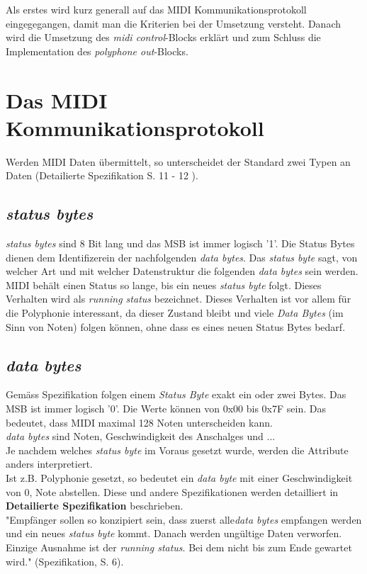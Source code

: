 Als erstes wird kurz generall auf das MIDI Kommunikationsprotokoll eingegegangen, damit man die Kriterien bei der Umsetzung versteht. Danach wird die Umsetzung des \textit{midi control}-Blocks erklärt und zum Schluss die Implementation des \textit{polyphone out}-Blocks.\\


\newpage
\section{Das MIDI Kommunikationsprotokoll}\label{sect.midi_spezification}
Werden MIDI Daten übermittelt, so unterscheidet der Standard zwei Typen an Daten (Detailierte Spezifikation S. 11 - 12 ).
\subsection{\textit{status bytes}}
\textit{status bytes} sind 8 Bit lang und das MSB ist immer logisch '1'. Die Status Bytes dienen dem Identifizerein der nachfolgenden \textit{data bytes}. Das \textit{status byte} sagt, von welcher Art und mit welcher Datenstruktur die folgenden \textit{data bytes} sein werden.\\
MIDI behält einen Status so lange, bis ein neues \textit{status byte} folgt. Dieses Verhalten wird als \textit{running status} bezeichnet. Dieses Verhalten ist vor allem für die Polyphonie interessant, da dieser Zustand bleibt und viele \textit{Data Bytes} (im Sinn von Noten) folgen können, ohne dass es eines neuen Status Bytes bedarf.\\

\subsection{\textit{data bytes}}
Gemäss Spezifikation folgen einem \textit{Status Byte} exakt ein oder zwei Bytes. Das MSB ist immer logisch '0'. Die Werte können von 0x00 bis 0x7F sein. Das bedeutet, dass MIDI maximal 128 Noten unterscheiden kann.\\
\textit{data bytes} sind Noten, Geschwindigkeit des Anschalges und ...\\
Je nachdem welches \textit{status byte} im Voraus gesetzt wurde, werden die Attribute anders interpretiert.\\
Ist z.B. Polyphonie gesetzt, so bedeutet ein \textit{data byte} mit einer Geschwindigkeit von 0, Note abstellen. Diese und andere Spezifikationen werden detailliert in \textbf{Detailierte Spezifikation} beschrieben.
\\
"Empfänger sollen so konzipiert sein, dass zuerst alle\textit{data bytes} empfangen werden und ein neues \textit{status byte} kommt. Danach werden ungültige Daten verworfen. Einzige Ausnahme ist der \textit{running status}. Bei dem nicht bis zum Ende gewartet wird." (Spezifikation, S. 6).\\

